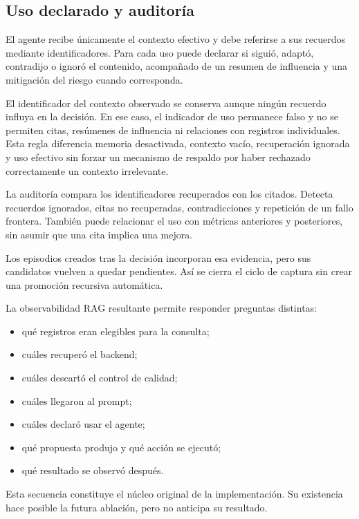 \subsection{Uso declarado y auditoría}

El agente recibe únicamente el contexto efectivo y debe referirse a sus
recuerdos mediante identificadores. Para cada uso puede declarar si siguió,
adaptó, contradijo o ignoró el contenido, acompañado de un resumen de
influencia y una mitigación del riesgo cuando corresponda.

El identificador del contexto observado se conserva aunque ningún recuerdo
influya en la decisión. En ese caso, el indicador de uso permanece falso y no
se permiten citas, resúmenes de influencia ni relaciones con registros
individuales. Esta regla diferencia memoria desactivada, contexto vacío,
recuperación ignorada y uso efectivo sin forzar un mecanismo de respaldo por haber rechazado
correctamente un contexto irrelevante.

La auditoría compara los identificadores recuperados con los citados. Detecta
recuerdos ignorados, citas no recuperadas, contradicciones y repetición de un
fallo frontera. También puede relacionar el uso con métricas anteriores y
posteriores, sin asumir que una cita implica una mejora.

Los episodios creados tras la decisión incorporan esa evidencia, pero sus
candidatos vuelven a quedar pendientes. Así se cierra el ciclo de captura sin
crear una promoción recursiva automática.

La observabilidad RAG resultante permite responder preguntas distintas:

\begin{itemize}
  \item qué registros eran elegibles para la consulta;
  \item cuáles recuperó el backend;
  \item cuáles descartó el control de calidad;
  \item cuáles llegaron al prompt;
  \item cuáles declaró usar el agente;
  \item qué propuesta produjo y qué acción se ejecutó;
  \item qué resultado se observó después.
\end{itemize}

Esta secuencia constituye el núcleo original de la implementación. Su
existencia hace posible la futura ablación, pero no anticipa su resultado.

